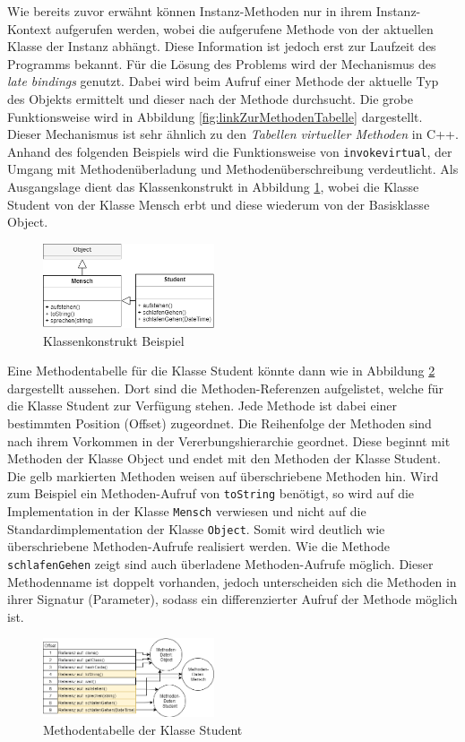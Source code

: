 \documentclass[conference]{IEEEtran}
\begin{document}
Wie bereits zuvor erwähnt können Instanz-Methoden nur in ihrem Instanz-Kontext aufgerufen werden, wobei die aufgerufene Methode von der aktuellen Klasse der Instanz abhängt. Diese Information ist jedoch erst zur Laufzeit des Programms bekannt. Für die Lösung des Problems wird der Mechanismus des \textit{late bindings} genutzt. Dabei wird beim Aufruf einer Methode der aktuelle Typ des Objekts ermittelt und dieser nach der Methode durchsucht. Die grobe Funktionsweise wird in Abbildung \ref{fig:linkZurMethodenTabelle} dargestellt. Dieser Mechanismus ist sehr ähnlich zu den \textit{Tabellen virtueller Methoden} in C++. Anhand des folgenden Beispiels wird die Funktionsweise von \verb|invokevirtual|, der Umgang mit Methodenüberladung und Methodenüberschreibung verdeutlicht. Als Ausgangslage dient das Klassenkonstrukt in Abbildung \ref{fig:umlHierarchie}, wobei die Klasse Student von der Klasse Mensch erbt und diese wiederum von der Basisklasse Object.
\begin{figure}[htbp] 
  \centering
     \includegraphics[width=0.45\textwidth]{Grafiken/UMLHierarchie.png}
  \caption{Klassenkonstrukt Beispiel}
  \label{fig:umlHierarchie}
\end{figure}
Eine Methodentabelle für die Klasse Student könnte dann wie in Abbildung \ref{fig:methodenTabelleUmlHierachie} dargestellt aussehen. Dort sind die Methoden-Referenzen aufgelistet, welche für die Klasse Student zur Verfügung stehen. Jede Methode ist dabei einer bestimmten Position (Offset) zugeordnet. Die Reihenfolge der Methoden sind nach ihrem Vorkommen in der Vererbungshierarchie geordnet. Diese beginnt mit Methoden der Klasse Object und endet mit den Methoden der Klasse Student. Die gelb markierten Methoden weisen auf überschriebene Methoden hin. Wird zum Beispiel ein Methoden-Aufruf von \verb|toString| benötigt, so wird auf die Implementation in der Klasse \verb|Mensch| verwiesen und nicht auf die Standardimplementation der Klasse \verb|Object|. Somit wird deutlich wie überschriebene Methoden-Aufrufe realisiert werden. Wie die Methode \verb|schlafenGehen| zeigt sind auch überladene Methoden-Aufrufe möglich. Dieser Methodenname ist doppelt vorhanden, jedoch unterscheiden sich die Methoden in ihrer Signatur (Parameter), sodass ein differenzierter Aufruf der Methode möglich ist.\cite{Venners.1999}
\begin{figure}[htbp] 
  \centering
     \includegraphics[width=0.45\textwidth]{Grafiken/MethodenTabelleAusHierarchie.png}
  \caption{Methodentabelle der Klasse Student}
  \label{fig:methodenTabelleUmlHierachie}
\end{figure}
\end{document}
